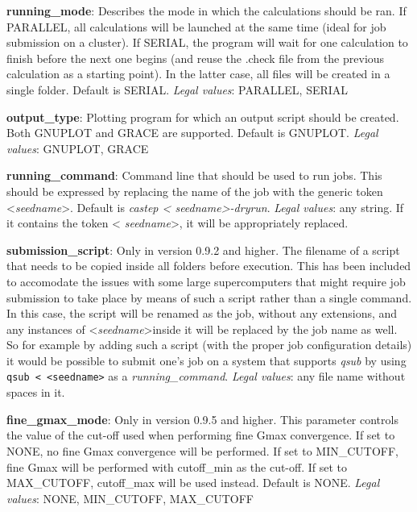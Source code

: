\documentclass[10pt]{article}
\begin{document}
\textbf{running\_mode}: Describes the mode in which the calculations should be 
ran. If PARALLEL, all calculations will be launched at the same time (ideal for 
job submission on a cluster). If SERIAL, the program will wait for one 
calculation to finish before the next one begins (and reuse the .check file from 
the previous calculation as a starting point). In the latter case, all files 
will be created in a single folder. Default is SERIAL.\newline
\textit{Legal values}: PARALLEL, SERIAL\newline

\textbf{output\_type}: Plotting program for which an output script should be 
created. Both GNUPLOT and GRACE are supported. Default is GNUPLOT.\newline
\textit{Legal values}: GNUPLOT, GRACE\newline

\textbf{running\_command}: Command line that should be used to run jobs. This 
should be expressed by replacing the name of the job with the generic token 
\textless \textit{seedname}\textgreater. Default is \textit{castep \textless 
seedname\textgreater -dryrun}.\newline
\textit{Legal values}: any string. If it contains the token \textless 
\textit{seedname}\textgreater, it will be appropriately replaced.\newline

\textbf{submission\_script}: Only in version 0.9.2 and higher. The filename of a 
script that needs to be copied inside all folders before execution. This has 
been included to accomodate the issues with some large supercomputers that might 
require job submission to take place by means of such a script rather than a 
single command. In this case, the script will be renamed as the job, without any 
extensions, and any instances of \textless \textit{seedname}\textgreater inside 
it will be replaced by the job name as well. So for example by adding such a 
script (with the proper job configuration details) it would be possible to 
submit one's job on a system that supports \textit{qsub} by using \texttt{qsub 
\textless~\textless seedname\textgreater} as a 
\textit{running\_command}.\newline
\textit{Legal values}: any file name without spaces in it.

\textbf{fine\_gmax\_mode}: Only in version 0.9.5 and higher. This parameter controls the value of the cut-off used when performing
fine Gmax convergence. If set to NONE, no fine Gmax convergence will be performed. If set to MIN\_CUTOFF, fine Gmax will be performed
with cutoff\_min as the cut-off. If set to MAX\_CUTOFF, cutoff\_max will be used instead. Default is NONE.
\newline
\textit{Legal values}: NONE, MIN\_CUTOFF, MAX\_CUTOFF
\end{document}
